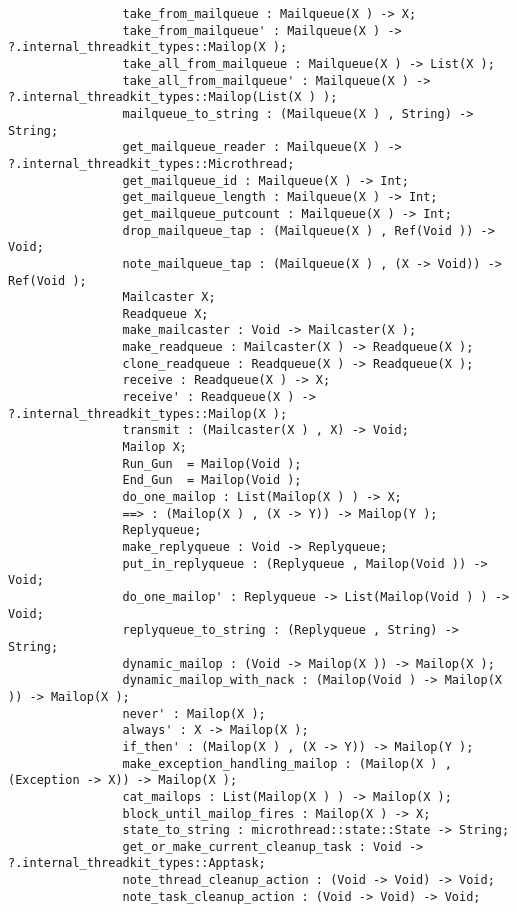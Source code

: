 \begin{verbatim}
                take_from_mailqueue : Mailqueue(X ) -> X;
                take_from_mailqueue' : Mailqueue(X ) -> ?.internal_threadkit_types::Mailop(X );
                take_all_from_mailqueue : Mailqueue(X ) -> List(X );
                take_all_from_mailqueue' : Mailqueue(X ) -> ?.internal_threadkit_types::Mailop(List(X ) );
                mailqueue_to_string : (Mailqueue(X ) , String) -> String;
                get_mailqueue_reader : Mailqueue(X ) -> ?.internal_threadkit_types::Microthread;
                get_mailqueue_id : Mailqueue(X ) -> Int;
                get_mailqueue_length : Mailqueue(X ) -> Int;
                get_mailqueue_putcount : Mailqueue(X ) -> Int;
                drop_mailqueue_tap : (Mailqueue(X ) , Ref(Void )) -> Void;
                note_mailqueue_tap : (Mailqueue(X ) , (X -> Void)) -> Ref(Void );
                Mailcaster X;
                Readqueue X;
                make_mailcaster : Void -> Mailcaster(X );
                make_readqueue : Mailcaster(X ) -> Readqueue(X );
                clone_readqueue : Readqueue(X ) -> Readqueue(X );
                receive : Readqueue(X ) -> X;
                receive' : Readqueue(X ) -> ?.internal_threadkit_types::Mailop(X );
                transmit : (Mailcaster(X ) , X) -> Void;
                Mailop X;
                Run_Gun  = Mailop(Void );
                End_Gun  = Mailop(Void );
                do_one_mailop : List(Mailop(X ) ) -> X;
                ==> : (Mailop(X ) , (X -> Y)) -> Mailop(Y );
                Replyqueue;
                make_replyqueue : Void -> Replyqueue;
                put_in_replyqueue : (Replyqueue , Mailop(Void )) -> Void;
                do_one_mailop' : Replyqueue -> List(Mailop(Void ) ) -> Void;
                replyqueue_to_string : (Replyqueue , String) -> String;
                dynamic_mailop : (Void -> Mailop(X )) -> Mailop(X );
                dynamic_mailop_with_nack : (Mailop(Void ) -> Mailop(X )) -> Mailop(X );
                never' : Mailop(X );
                always' : X -> Mailop(X );
                if_then' : (Mailop(X ) , (X -> Y)) -> Mailop(Y );
                make_exception_handling_mailop : (Mailop(X ) , (Exception -> X)) -> Mailop(X );
                cat_mailops : List(Mailop(X ) ) -> Mailop(X );
                block_until_mailop_fires : Mailop(X ) -> X;
                state_to_string : microthread::state::State -> String;
                get_or_make_current_cleanup_task : Void -> ?.internal_threadkit_types::Apptask;
                note_thread_cleanup_action : (Void -> Void) -> Void;
                note_task_cleanup_action : (Void -> Void) -> Void;

\end{verbatim}
